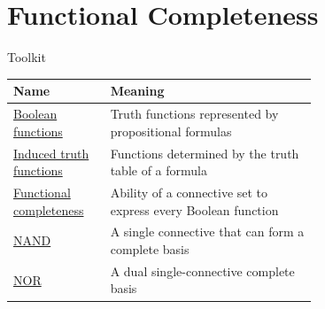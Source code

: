 \section{Functional Completeness}

\begin{toolkitbox}{Toolkit}
\small
\begin{tabular}{l p{0.68\linewidth}}
\toprule
\textbf{Name} & \textbf{Meaning} \\
\midrule
\hyperref[def:boolean-function-representation-propositional-logic]{Boolean functions} & Truth functions represented by propositional formulas \\
\hyperref[def:truth-function-induced-by-formula]{Induced truth functions} & Functions determined by the truth table of a formula \\
\hyperref[def:functionally-complete-connective-set-propositional-logic]{Functional completeness} & Ability of a connective set to express every Boolean function \\
\hyperref[def:nand-connective-propositional-logic]{NAND} & A single connective that can form a complete basis \\
\hyperref[def:nor-connective-propositional-logic]{NOR} & A dual single-connective complete basis \\
\bottomrule
\end{tabular}
\end{toolkitbox}













